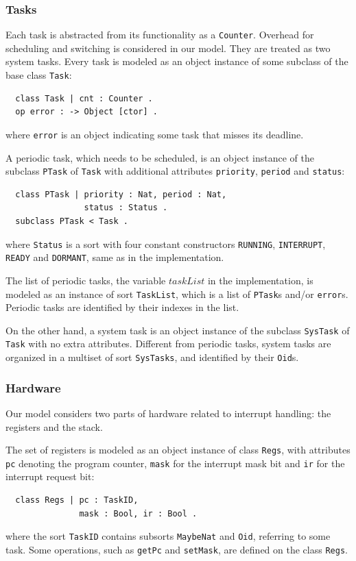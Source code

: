 \documentclass[12pt,onecolumn]{IEEEtranTIE}
\begin{document}
\subsubsection{Tasks}
Each task is abstracted from its functionality as a \verb|Counter|.
Overhead for scheduling and switching is considered in our model. They
are treated as two system tasks. Every task is modeled as an object
instance of some subclass of the base class \verb|Task|:
\begin{verbatim}
  class Task | cnt : Counter .
  op error : -> Object [ctor] .
\end{verbatim}
where \verb|error| is an object indicating some task that misses its
deadline.

A periodic task, which needs to be scheduled, is an object instance of
the subclass \verb|PTask| of \verb|Task| with additional attributes
\verb|priority|, \verb|period| and \verb|status|:
\begin{verbatim}
  class PTask | priority : Nat, period : Nat, 
                status : Status .
  subclass PTask < Task .
\end{verbatim}
where \verb|Status| is a sort with four constant constructors
\verb|RUNNING|, \verb|INTERRUPT|, \verb|READY| and \verb|DORMANT|,
same as in the implementation.

The list of periodic tasks, the variable $\mathit{taskList}$ in the
implementation, is modeled as an instance of sort \verb|TaskList|,
which is a list of \verb|PTask|s and/or \verb|error|s.  Periodic tasks
are identified by their indexes in the list.

On the other hand, a system task is an object instance of the subclass
\verb|SysTask| of \verb|Task| with no extra attributes.  Different
from periodic tasks, system tasks are organized in a multiset of sort
\verb|SysTasks|, and identified by their \verb|Oid|s.

\subsubsection{Hardware}
Our model considers two parts of hardware related to interrupt
handling: the registers and the stack.

The set of registers is modeled as an object instance of class
\verb|Regs|, with attributes \verb|pc| denoting the program counter,
\verb|mask| for the interrupt mask bit and \verb|ir| for the interrupt
request bit:
\begin{verbatim}
  class Regs | pc : TaskID, 
               mask : Bool, ir : Bool .
\end{verbatim}
where the sort \verb|TaskID| contains subsorts \verb|MaybeNat| and
\verb|Oid|, referring to some task. Some operations, such as
\verb|getPc| and \verb|setMask|, are defined on the class \verb|Regs|.
\end{document}
